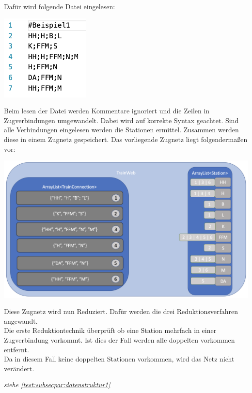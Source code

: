 Dafür wird folgende Datei eingelesen:\\
\begin{center}
    \includegraphics[scale=0.75]{images/Programmdurchlauf/eingabedatei.png}
    \label{test:subsecpar:eingabedatei}
\end{center}

Beim lesen der Datei werden Kommentare ignoriert und die Zeilen in Zugverbindungen umgewandelt. Dabei wird auf korrekte Syntax geachtet.
Sind alle Verbindungen eingelesen werden die Stationen ermittel. Zusammen werden diese in einem Zugnetz gespeichert. Das vorliegende Zugnetz liegt folgendermaßen vor:\\

\begin{center}
    \includegraphics[width=\linewidth]{images/Programmdurchlauf/Datenstruktur01.png}
    \label{test:subsecpar:datenstruktur1}
\end{center}

Diese Zugnetz wird nun Reduziert. Dafür werden die drei Reduktionsverfahren angewandt.\\
Die erste Reduktiontechnik überprüft ob eine Station mehrfach in einer Zugverbindung vorkommt. Ist dies der Fall werden alle doppelten vorkommen entfernt.\\
Da in diesem Fall keine doppelten Stationen vorkommen, wird das Netz nicht verändert.
\begin{center}
    \textit{siehe \ref{test:subsecpar:datenstruktur1}}
\end{center}

